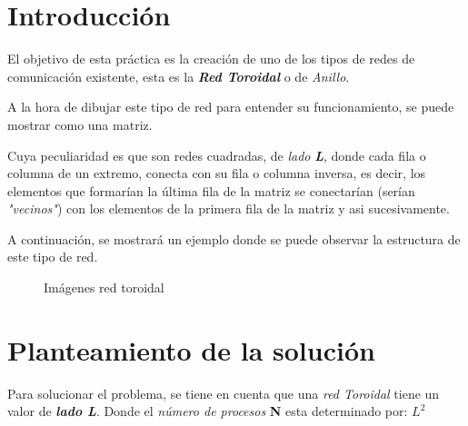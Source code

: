 \documentclass[11pt]{article}
\begin{document}
\section{Introducción}
El objetivo de esta práctica es la creación de uno de los tipos de redes de comunicación existente, esta es la \textbf{\textit{Red Toroidal}} o de \textit{Anillo}.

A la hora de dibujar este tipo de red para entender su funcionamiento, se puede mostrar como una matriz. 

Cuya peculiaridad es que son redes cuadradas, de \textit{lado} \textit{\textbf{L}}, donde cada fila o columna de un extremo, conecta con su fila o columna inversa, es decir, los elementos que formarían la última fila de la matriz se conectarían (serían \textit{"vecinos"}) con los elementos de la primera fila de la matriz y asi sucesivamente.

A continuación, se mostrará un ejemplo donde se puede observar la estructura de este tipo de red.

\begin{figure}[h!]
  \centering
  \caption{Imágenes red toroidal}
  \label{fig:toroide}
\end{figure}

\clearpage


\section{Planteamiento de la solución}
Para solucionar el problema, se tiene en cuenta que una \textit{red Toroidal} tiene un valor de \textit{\textbf{lado L}}.
Donde el \textit{número de procesos} \textbf{N} esta determinado por: \textbf{$L^{2}$}
\end{document}
